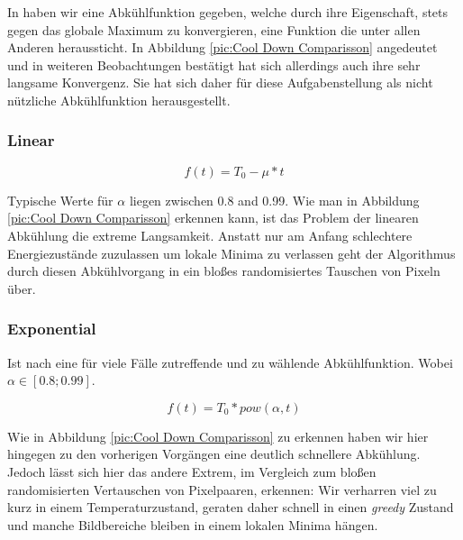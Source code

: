 In \cite{hajek1988cooling} haben wir eine Abkühlfunktion gegeben, welche durch ihre Eigenschaft,
stets gegen das globale Maximum zu konvergieren, eine Funktion die unter allen Anderen heraussticht.
In Abbildung \ref{pic:Cool Down Comparisson} angedeutet und in weiteren Beobachtungen bestätigt hat sich 
allerdings auch ihre sehr langsame Konvergenz.
Sie hat sich daher für diese Aufgabenstellung als nicht nützliche Abkühlfunktion herausgestellt.

\subsubsection{Linear}
\begin{tcolorbox}[rightrule=3mm, rounded corners=east]
    \begin{equation}\label{eq:lineare Abkühlung}
        f(t) = T_0 - \mu*t
    \end{equation}
\end{tcolorbox}

Typische Werte für $\alpha$ liegen zwischen 0.8 and 0.99. Wie man in Abbildung \ref{pic:Cool Down Comparisson}
erkennen kann, ist das Problem der linearen Abkühlung die extreme Langsamkeit.
Anstatt nur am Anfang schlechtere Energiezustände zuzulassen um lokale Minima zu verlassen 
geht der Algorithmus durch diesen Abkühlvorgang in ein bloßes randomisiertes Tauschen von Pixeln über.

\subsubsection{Exponential}
Ist nach \cite{Kirkpatrick671} eine für viele Fälle zutreffende und zu wählende Abkühlfunktion.
Wobei $\alpha \in [0.8; 0.99]$.

\begin{tcolorbox}[rightrule=3mm, rounded corners=east]
    \begin{equation}\label{eq:Exponential}
        f(t) = T_0*pow(\alpha,t)
    \end{equation}
\end{tcolorbox}

Wie in Abbildung \ref{pic:Cool Down Comparisson} zu erkennen haben wir hier hingegen zu den vorherigen Vorgängen
eine deutlich schnellere Abkühlung. Jedoch lässt sich hier das andere Extrem, im Vergleich zum bloßen randomisierten
Vertauschen von Pixelpaaren, erkennen: Wir verharren viel zu kurz in einem Temperaturzustand, geraten daher schnell 
in einen \textit{greedy} Zustand und manche Bildbereiche bleiben in einem lokalen Minima hängen.

